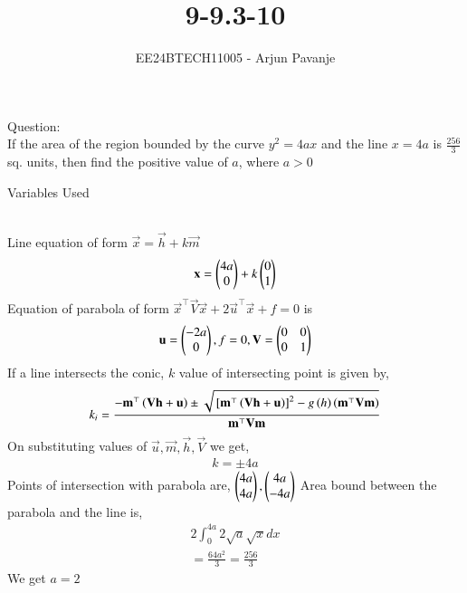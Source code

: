 \documentclass[journal]{IEEEtran}
\begin{document}

\vspace{3cm}

\title{9-9.3-10}
\author{EE24BTECH11005 - Arjun Pavanje}
{\let\newpage\relax\maketitle}
Question:\\
If the area of the region bounded by the curve $y^2=4ax$ and the line $x=4a$ is $\frac{256}{3}$ sq. units, then find the positive value of $a$, where $a>0$
\begin{table}[h!]    
  \centering
  
  \caption{Variables Used}
  \label{tab1-1.9-6}
\end{table}\\
\solution
Line equation of form $\vec{x}=\vec{h}+k\vec{m}$
\begin{align}
\mathbf{x}=\begin{pmatrix}4a\\0\end{pmatrix}+k\begin{pmatrix}0\\1\end{pmatrix}
\end{align}
Equation of parabola of form $\vec{x}^{\top}\vec{V}\vec{x}+2\vec{u}^{\top}\vec{x}+f=0$ is
\begin{align}
	\mathbf{u}=\begin{pmatrix}-2a\\0\end{pmatrix},f=0,\mathbf{V}=\begin{pmatrix}0&0\\0&1\end{pmatrix}
\end{align}
If a line intersects the conic, $k$ value of intersecting point is given by,
\begin{align}
	k_i=\frac{-\mathbf{m}^{\top}\left(\mathbf{Vh}+\mathbf{u}\right)\pm\sqrt{{}\left[\mathbf{m}^{\top}\left(\mathbf{Vh}+\mathbf{u}\right)\right]^2-g\left(h\right)\left(\mathbf{m}^{\top}\mathbf{Vm}\right)}}{\mathbf{m}^{\top}\mathbf{Vm}}
\end{align}
On substituting values of $\vec{u},\vec{m},\vec{h},\vec{V}$ we get,
\begin{align}
	k=\pm4a
\end{align}
Points of intersection with parabola are, $\begin{pmatrix}4a\\4a\end{pmatrix},\begin{pmatrix}4a\\-4a\end{pmatrix}$
Area bound between the parabola and the line is,
\begin{align}
	2\int_0^{4a} 2\sqrt{a}\sqrt{x}dx\\
	=\frac{64a^2}{3}=\frac{256}{3}
\end{align}
We get $a=2$\\
\end{document}
